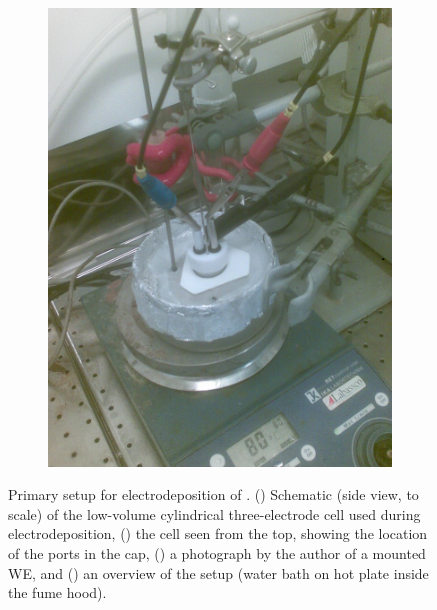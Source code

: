 \documentclass[draft,webedition,openright,titles,swedish,english]{LuaUUThesis}\usepackage[]{graphicx}\usepackage[]{xcolor}
\begin{document}
\begin{figure}[tbp]
{\begin{subfigure}[c]{0.33\linewidth}
    \includegraphics[width=\linewidth,trim={1cm 0cm 1cm 0cm},clip]{synthesis/electrodeposition/0909014.jpg}
    \caption{}
    \label{fig:0201-ED-CHI}
\end{subfigure}%
}%
\caption[Primary electrodeposition setup]{%
  Primary setup for electrodeposition of \zincox.
  ()
  Schematic (side view, to scale) of the low-volume cylindrical three-electrode cell
  used during electrodeposition,
  ()
  the cell seen from the top, showing the location of the ports in the cap,
  ()
  a photograph by the author of a mounted \gls{WE}, and
  ()
  an overview of the setup (water bath on hot plate inside the fume hood).
}
\label{fig:0201-electrodeposition-schematic}
\end{figure}
\end{document}

